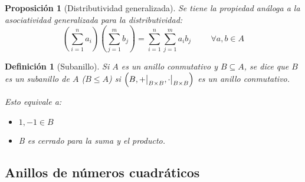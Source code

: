 \documentclass[11pt, a4paper, titlepage]{article}
\newif\IfInSansMode
\newcommand\restr[2]{{%
  \left.\kern-\nulldelimiterspace %
  #1 %
  \vphantom{\big|} %
  \right|_{#2} %
  }}
\theoremstyle{theorem-style}
\newtheorem{nprop}{Proposición}[section]
\theoremstyle{definition-style}
\newtheorem{ndef}{Definición}[section]
\theoremstyle{remark-style}
\theoremstyle{example-style}
\begin{document}
\begin{nprop}[Distributividad generalizada]
Se tiene la propiedad análoga a la asociatividad generalizada para la distributividad:
	\[\left(\sum_{i=1}^{n} a_i\right)\left(\sum_{j=1}^{m}b_j\right) = \sum_{i=1}^{n}\sum_{j=1}^{m}a_i b_j \hspace{1cm} \forall a,b\in A\]
\end{nprop}

\begin{ndef}[Subanillo]

Si $A$ es un anillo conmutativo y $B \subseteq A$, se dice que $B$ es un subanillo de $A$ ($B \leq A$) si $\left(B, \restr{+}{B\times B}, \restr{\cdot}{B\times B}\right)$ es un anillo conmutativo.

Esto equivale a:
\begin{itemize}
\item $1,-1 \in B$
\item B es cerrado para la suma y el producto.
\end{itemize}

\end{ndef}

\newpage

\subsection*{Anillos de números cuadráticos}
\end{document}
